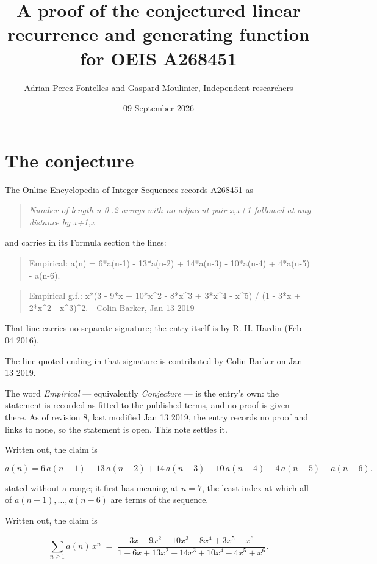 \documentclass[11pt]{article}
\title{A proof of the conjectured linear recurrence and generating function for OEIS A268451}
\author{Adrian Perez Fontelles and Gaspard Moulinier, Independent researchers}
\date{09 September 2026}
\theoremstyle{definition}
\begin{document}
\maketitle
\section{The conjecture}

The Online Encyclopedia of Integer Sequences records \href{https://oeis.org/A268451}{A268451} as

\begin{quote}\itshape Number of length-n 0..2 arrays with no adjacent pair x,x+1 followed at any distance by x+1,x\end{quote}

and carries in its Formula section the lines:

\begin{quote}\ttfamily Empirical: a(n) = 6*a(n-1) - 13*a(n-2) + 14*a(n-3) - 10*a(n-4) + 4*a(n-5) - a(n-6).\end{quote}

\begin{quote}\ttfamily Empirical g.f.: x*(3 - 9*x + 10*x\textasciicircum{}2 - 8*x\textasciicircum{}3 + 3*x\textasciicircum{}4 - x\textasciicircum{}5) / (1 - 3*x + 2*x\textasciicircum{}2 - x\textasciicircum{}3)\textasciicircum{}2. - Colin Barker, Jan 13 2019\end{quote}

That line carries no separate signature; the entry itself is by R. H. Hardin (Feb 04 2016).

The line quoted ending in that signature is contributed by Colin Barker on Jan 13 2019.

The word {\itshape Empirical} --- equivalently {\itshape Conjecture} --- is the entry's own: the statement is recorded as fitted to the published terms, and no proof is given there. As of revision 8, last modified Jan 13 2019, the entry records no proof and links to none, so the statement is open. This note settles it.

Written out, the claim is

\[a(n) = 6\,a(n-1) - 13\,a(n-2) + 14\,a(n-3) - 10\,a(n-4) + 4\,a(n-5) - a(n-6).\]

stated without a range; it first has meaning at $n = 7$, the least index at which all of $a(n-1),\dots,a(n-6)$ are terms of the sequence.

Written out, the claim is

\[\sum_{n \ge 1} a(n)\,x^n \;=\; \frac{3x - 9x^{2} + 10x^{3} - 8x^{4} + 3x^{5} - x^{6}}{1 - 6x + 13x^{2} - 14x^{3} + 10x^{4} - 4x^{5} + x^{6}}.\]
\end{document}
